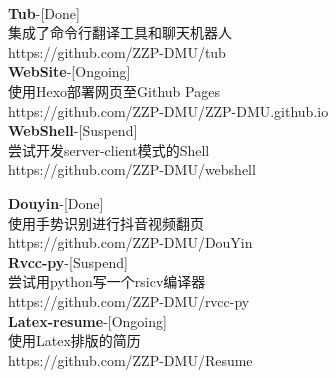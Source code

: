 \documentclass{ctexart}
\begin{document}
\begin{center}
    \hrulefill \\
    \begin{minipage}[t]{18em}
        \textbullet \textbf{Tub}-[Done] \\
        集成了命令行翻译工具和聊天机器人\\
        https://github.com/ZZP-DMU/tub \\
        \textbullet \textbf{WebSite}-[Ongoing] \\
        使用Hexo部署网页至Github Pages \\
        https://github.com/ZZP-DMU/ZZP-DMU.github.io \\
        \textbullet \textbf{WebShell}-[Suspend] \\
        尝试开发server-client模式的Shell \\
        https://github.com/ZZP-DMU/webshell 
    \end{minipage}
    \begin{minipage}[t]{18em}
        \textbullet \textbf{Douyin}-[Done] \\
        使用手势识别进行抖音视频翻页 \\
        https://github.com/ZZP-DMU/DouYin \\
        \textbullet \textbf{Rvcc-py}-[Suspend] \\
        尝试用python写一个rsicv编译器 \\
        https://github.com/ZZP-DMU/rvcc-py \\
        \textbullet \textbf{Latex-resume}-[Ongoing] \\
        使用Latex排版的简历 \\
        https://github.com/ZZP-DMU/Resume \\
    \end{minipage}
\end{center}
\end{document}
